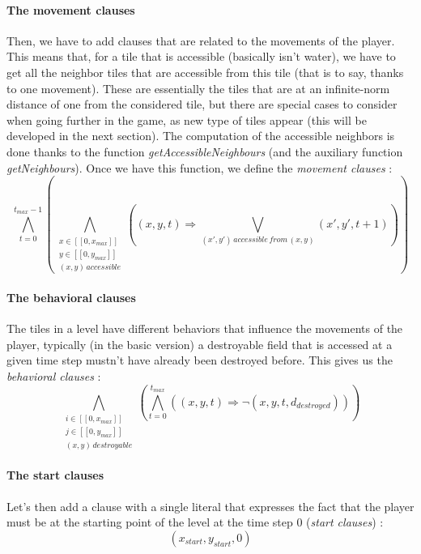 \documentclass[a4paper, 12pt, titlepage]{article}
\begin{document}
\paragraph{The movement clauses}
Then, we have to add clauses that are related to the movements of the player.
This means that, for a tile that is accessible (basically isn't water), we have
to get all the neighbor tiles that are accessible from this tile (that is to
say, thanks to one movement). These are essentially the tiles that are at an
infinite-norm distance of one from the considered tile, but there are special
cases to consider when going further in the game, as new type of tiles appear
(this will be developed in the next section). The computation of the accessible
neighbors is done thanks to the function {\em getAccessibleNeighbours} (and the
auxiliary function {\em getNeighbours}). Once we have this function, we define
the {\em movement clauses} :
\begin{equation}
\bigwedge \limits_{t=0}^{t_{max}-1}
       (\bigwedge \limits_{\substack{x \in [\![0, x_{max}]\!]\\
				     y \in [\![0, y_{max}]\!]\\
				     (x, y) \, accessible}}
	((x, y, t) \Rightarrow
	 \bigvee \limits_{(x', y') \, accessible \, from \, (x, y)}
	 (x', y', t+1)))
\end{equation}

\paragraph{The behavioral clauses}
The tiles in a level have different behaviors that influence the movements of
the player, typically (in the basic version) a destroyable field that is
accessed at a given time step mustn't have already been destroyed before. This
gives us the {\em behavioral clauses} :
\begin{equation}
\bigwedge \limits_{\substack{i \in [\![0, x_{max}]\!]\\
			     j \in [\![0, y_{max}]\!]\\
			     (x, y) \, destroyable}}
(\bigwedge \limits_{t=0}^{t_{max}} ((x, y, t) \Rightarrow
				    \neg(x, y, t, d_{destroyed})))
\end{equation}

\paragraph{The start clauses}
Let's then add a clause with a single literal that expresses the fact that the
player must be at the starting point of the level at the time step 0
({\em start clauses}) :
\begin{equation}
(x_{start}, y_{start}, 0)
\end{equation}
\end{document}
